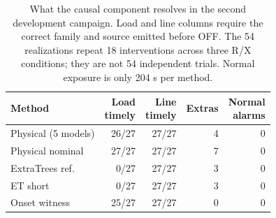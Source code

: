 \begin{table}[t]\centering\small
\caption{What the causal component resolves in the second development campaign. Load and line columns require the correct family and source emitted before OFF. The 54 realizations repeat 18 interventions across three R/X conditions; they are not 54 independent trials. Normal exposure is only 204 s per method.}
\label{tab:narrative-results}
\setlength{\tabcolsep}{3pt}\begin{tabular}{lrrrr}\toprule
Method & \shortstack{Load\\timely} & \shortstack{Line\\timely} & Extras & \shortstack{Normal\\alarms}\\\midrule
Physical (5 models) & 26/27 & 27/27 & 4 & 0\\
Physical nominal & 27/27 & 27/27 & 7 & 0\\
ExtraTrees ref. & 0/27 & 27/27 & 3 & 0\\
ET short & 0/27 & 27/27 & 3 & 0\\
Onset witness & 25/27 & 27/27 & 0 & 0\\
\bottomrule\end{tabular}\end{table}
